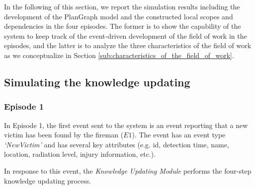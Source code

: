 In the following of this section, we report the simulation results including the development of the PlanGraph model and the constructed local scopes and dependencies in the four episodes. The former is to show the capability of the system to keep track of the event-driven development of the field of work in the episodes, and the latter is to analyze the three characteristics of the field of work as we conceptualize in Section \ref{sub:characteristics_of_the_field_of_work}.

\subsection{Simulating the knowledge updating} %
\label{sub:simulating_the_knowledge_updating}
\subsubsection{Episode 1} %
\label{ssub:episode_1}
In Episode 1, the first event sent to the system is an event reporting that a new victim has been found by the fireman ($E1$). The event has an event type \emph{`NewVictim'} and has several key attributes (e.g. id, detection time, name, location, radiation level, injury information, etc.). 

In response to this event, the \emph{Knowledge Updating Module} performs the four-step knowledge updating process.

